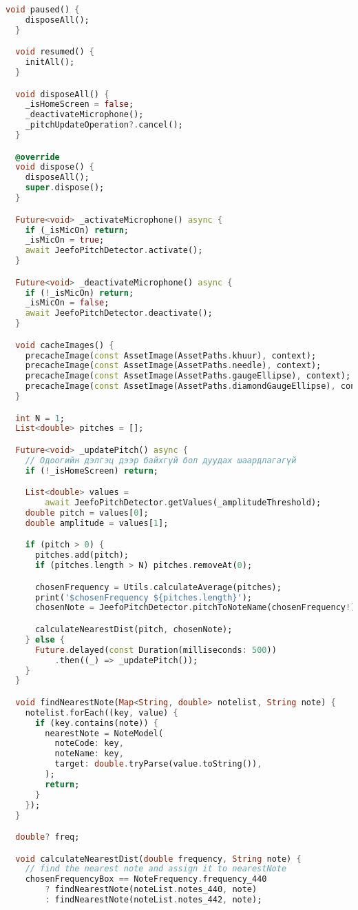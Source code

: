 \begin{lstlisting}[language=Dart, caption=Нүүр хуудас дахь логикийн хэрэгжүүлэлт, frame=single]
  void paused() {
    disposeAll();
  }

  void resumed() {
    initAll();
  }

  void disposeAll() {
    _isHomeScreen = false;
    _deactivateMicrophone();
    _pitchUpdateOperation?.cancel();
  }

  @override
  void dispose() {
    disposeAll();
    super.dispose();
  }

  Future<void> _activateMicrophone() async {
    if (_isMicOn) return;
    _isMicOn = true;
    await JeefoPitchDetector.activate();
  }

  Future<void> _deactivateMicrophone() async {
    if (!_isMicOn) return;
    _isMicOn = false;
    await JeefoPitchDetector.deactivate();
  }

  void cacheImages() {
    precacheImage(const AssetImage(AssetPaths.khuur), context);
    precacheImage(const AssetImage(AssetPaths.needle), context);
    precacheImage(const AssetImage(AssetPaths.gaugeEllipse), context);
    precacheImage(const AssetImage(AssetPaths.diamondGaugeEllipse), context);
  }

  int N = 1;
  List<double> pitches = [];

  Future<void> _updatePitch() async {
    // Одоогийн дэлгэц дээр байхгүй бол дуудах шаардлагагүй
    if (!_isHomeScreen) return;

    List<double> values =
        await JeefoPitchDetector.getValues(_amplitudeThreshold);
    double pitch = values[0];
    double amplitude = values[1];

    if (pitch > 0) {
      pitches.add(pitch);
      if (pitches.length > N) pitches.removeAt(0);

      chosenFrequency = Utils.calculateAverage(pitches);
      print('$chosenFrequency ${pitches.length}');
      chosenNote = JeefoPitchDetector.pitchToNoteName(chosenFrequency!);

      calculateNearestDist(pitch, chosenNote);
    } else {
      Future.delayed(const Duration(milliseconds: 500))
          .then((_) => _updatePitch());
    }
  }

  void findNearestNote(Map<String, double> notelist, String note) {
    notelist.forEach((key, value) {
      if (key.contains(note)) {
        nearestNote = NoteModel(
          noteCode: key,
          noteName: key,
          target: double.tryParse(value.toString()),
        );
        return;
      }
    });
  }

  double? freq;

  void calculateNearestDist(double frequency, String note) {
    // find the nearest note and assign it to nearestNote
    chosenFrequencyBox == NoteFrequency.frequency_440
        ? findNearestNote(noteList.notes_440, note)
        : findNearestNote(noteList.notes_442, note);


\end{lstlisting}
